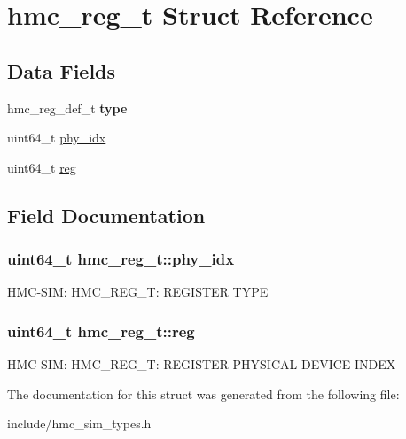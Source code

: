 \hypertarget{structhmc__reg__t}{\section{hmc\-\_\-reg\-\_\-t Struct Reference}
\label{structhmc__reg__t}
}
\subsection*{Data Fields}
\begin{DoxyCompactItemize}
\item 
\hypertarget{structhmc__reg__t_ae40516be3c46285fcd080617eef883ff}{hmc\-\_\-reg\-\_\-def\-\_\-t {\bfseries type}}\label{structhmc__reg__t_ae40516be3c46285fcd080617eef883ff}

\item 
uint64\-\_\-t \hyperlink{structhmc__reg__t_ad84180665ae2f75aa32ae32dc402a300}{phy\-\_\-idx}
\item 
uint64\-\_\-t \hyperlink{structhmc__reg__t_a6fb132b4b46aff074b3cb87452a83a58}{reg}
\end{DoxyCompactItemize}


\subsection{Field Documentation}
\hypertarget{structhmc__reg__t_ad84180665ae2f75aa32ae32dc402a300}{
\subsubsection[{phy\-\_\-idx}]{\setlength{\rightskip}{0pt plus 5cm}uint64\-\_\-t hmc\-\_\-reg\-\_\-t\-::phy\-\_\-idx}}\label{structhmc__reg__t_ad84180665ae2f75aa32ae32dc402a300}
H\-M\-C-\/\-S\-I\-M\-: H\-M\-C\-\_\-\-R\-E\-G\-\_\-\-T\-: R\-E\-G\-I\-S\-T\-E\-R T\-Y\-P\-E \hypertarget{structhmc__reg__t_a6fb132b4b46aff074b3cb87452a83a58}{
\subsubsection[{reg}]{\setlength{\rightskip}{0pt plus 5cm}uint64\-\_\-t hmc\-\_\-reg\-\_\-t\-::reg}}\label{structhmc__reg__t_a6fb132b4b46aff074b3cb87452a83a58}
H\-M\-C-\/\-S\-I\-M\-: H\-M\-C\-\_\-\-R\-E\-G\-\_\-\-T\-: R\-E\-G\-I\-S\-T\-E\-R P\-H\-Y\-S\-I\-C\-A\-L D\-E\-V\-I\-C\-E I\-N\-D\-E\-X 

The documentation for this struct was generated from the following file\-:\begin{DoxyCompactItemize}
\item 
include/hmc\-\_\-sim\-\_\-types.\-h\end{DoxyCompactItemize}
